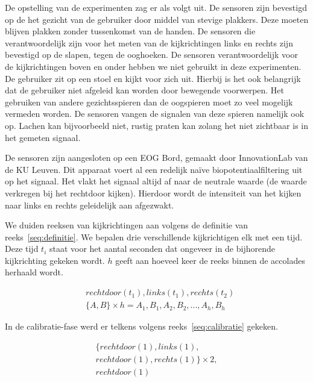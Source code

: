 \documentclass{article}
\begin{document}
De opstelling van de experimenten zag er als volgt uit. De sensoren zijn bevestigd op de het gezicht van de gebruiker door middel van stevige plakkers. Deze moeten blijven plakken zonder tussenkomst van de handen. De sensoren die verantwoordelijk zijn voor het meten van de kijkrichtingen links en rechts zijn bevestigd op de slapen, tegen de ooghoeken. De sensoren verantwoordelijk voor de kijkrichtingen boven en onder hebben we niet gebruikt in deze experimenten. De gebruiker zit op een stoel en kijkt voor zich uit. Hierbij is het ook belangrijk dat de gebruiker niet afgeleid kan worden door bewegende voorwerpen. Het gebruiken van andere gezichtsspieren dan de oogspieren moet zo veel mogelijk vermeden worden. De sensoren vangen de signalen van deze spieren namelijk ook op. Lachen kan bijvoorbeeld niet, rustig praten kan zolang het niet zichtbaar is in het gemeten signaal.

De sensoren zijn aangesloten op een EOG Bord, gemaakt door InnovationLab van de KU Leuven. Dit apparaat voert al een redelijk naïve biopotentiaalfiltering uit op het signaal. Het vlakt het signaal altijd af naar de neutrale waarde (de waarde verkregen bij het rechtdoor kijken). Hierdoor wordt de intensiteit van het kijken naar links en rechts geleidelijk aan afgezwakt.

We duiden reeksen van kijkrichtingen aan volgens de definitie van reeks~\ref{seq:definitie}. We bepalen drie verschillende kijkrichtigen elk met een tijd. Deze tijd $t_i$ staat voor het aantal seconden dat ongeveer in de bijhorende kijkrichting gekeken wordt. $h$ geeft aan hoeveel keer de reeks binnen de accolades herhaald wordt.

\begin{equation}
\label{seq:definitie}
\begin{aligned}
& rechtdoor(t_1),  links (t_1), rechts (t_2) \\
& \{ A, B\} \times h = A_1, B_1, A_2, B_2, ... , A_h, B_h
\end{aligned}
\end{equation}

In de calibratie-fase werd er telkens volgens reeks~\ref{seq:calibratie} gekeken.

\begin{equation}
\label{seq:calibratie}
\begin{aligned}
&\{rechtdoor(1), links(1), &\\
&rechtdoor(1), rechts(1)\} \times 2, &\\
& rechtdoor(1)&
\end{aligned}
\end{equation}
\end{document}
